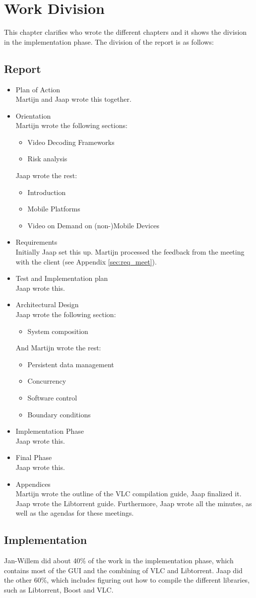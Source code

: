 \chapter{Work Division}
\label{sec:work_div}
This chapter clarifies who wrote the different chapters and it shows the division in the implementation phase. The division of the report is as follows:

\section{Report}
\begin{itemize}
\item Plan of Action\\
Martijn and Jaap wrote this together.
\item Orientation\\
	Martijn wrote the following sections:
	\begin{itemize}
	\item Video Decoding Frameworks
	\item Risk analysis
	\end{itemize}
	Jaap wrote the rest:
	\begin{itemize}
	\item Introduction
	\item Mobile Platforms
	\item Video on Demand on (non-)Mobile Devices
	\end{itemize}
\item Requirements\\
Initially Jaap set this up. Martijn processed the feedback from the meeting with the client (see Appendix \ref{sec:req_meet}).
\item Test and Implementation plan\\
Jaap wrote this.
\item Architectural Design\\
Jaap wrote the following section:
	\begin{itemize}
	\item System composition
	\end{itemize}
And Martijn wrote the rest:
	\begin{itemize}
	\item Persistent data management
	\item Concurrency
	\item Software control
	\item Boundary conditions
	\end{itemize}
\item Implementation Phase \\
Jaap wrote this.
\item Final Phase \\
Jaap wrote this.
\item Appendices \\
Martijn wrote the outline of the VLC compilation guide, Jaap finalized it. Jaap wrote the Libtorrent guide. Furthermore, Jaap wrote all the minutes, as well as the agendas for these meetings. 
\end{itemize}

\section{Implementation}
Jan-Willem did about 40\% of the work in the implementation phase, which contains most of the GUI and the combining of VLC and Libtorrent. Jaap did the other 60\%, which includes figuring out how to compile the different libraries, such as Libtorrent, Boost and VLC.
